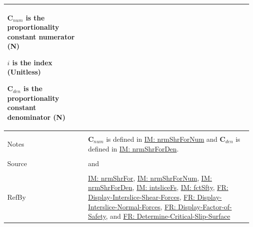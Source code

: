 \documentclass[12pt]{article}
\begin{document}
\begin{minipage}{\textwidth}
\begin{tabular}{>{\raggedright}p{}>{\raggedright\arraybackslash}p{}}
\begin{symbDescription}
                        \item{${\mathbf{C}_{num}}$ is the proportionality constant numerator (N)}
                        \item{$i$ is the index (Unitless)}
                        \item{${\mathbf{C}_{den}}$ is the proportionality constant denominator (N)}
                        \end{symbDescription}
          \\ \midrule \\
          Notes & ${\mathbf{C}_{num}}$ is defined in \hyperref[IM:nrmShrForNum]{IM: nrmShrForNum} and ${\mathbf{C}_{den}}$ is defined in \hyperref[IM:nrmShrForDen]{IM: nrmShrForDen}.
          \\ \midrule \\
          Source & \cite{chen2005} and \cite{karchewski2012}
          \\ \midrule \\
          RefBy & \hyperref[IM:nrmShrFor]{IM: nrmShrFor}, \hyperref[IM:nrmShrForNum]{IM: nrmShrForNum}, \hyperref[IM:nrmShrForDen]{IM: nrmShrForDen}, \hyperref[IM:intsliceFs]{IM: intsliceFs}, \hyperref[IM:fctSfty]{IM: fctSfty}, \hyperref[displayShear]{FR: Display-Interslice-Shear-Forces}, \hyperref[displayNormal]{FR: Display-Interslice-Normal-Forces}, \hyperref[displayFS]{FR: Display-Factor-of-Safety}, and \hyperref[determineCritSlip]{FR: Determine-Critical-Slip-Surface}
          \\ \bottomrule
          \end{tabular}
          \end{minipage}
\end{document}
